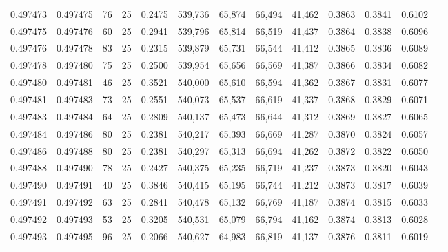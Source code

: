 \begin{tabular}{rrrrrrrrrrrrr}
0.497473 & 0.497475 &    76 &  25 &                                     0.2475 & 539,736 &  65,874 &  66,494 &  41,462 & 0.3863 & 0.3841 & 0.6102 \\
0.497475 & 0.497476 &    60 &  25 &                                     0.2941 & 539,796 &  65,814 &  66,519 &  41,437 & 0.3864 & 0.3838 & 0.6096 \\
0.497476 & 0.497478 &    83 &  25 &                                     0.2315 & 539,879 &  65,731 &  66,544 &  41,412 & 0.3865 & 0.3836 & 0.6089 \\
0.497478 & 0.497480 &    75 &  25 &                                     0.2500 & 539,954 &  65,656 &  66,569 &  41,387 & 0.3866 & 0.3834 & 0.6082 \\
0.497480 & 0.497481 &    46 &  25 &                                     0.3521 & 540,000 &  65,610 &  66,594 &  41,362 & 0.3867 & 0.3831 & 0.6077 \\
0.497481 & 0.497483 &    73 &  25 &                                     0.2551 & 540,073 &  65,537 &  66,619 &  41,337 & 0.3868 & 0.3829 & 0.6071 \\
0.497483 & 0.497484 &    64 &  25 &                                     0.2809 & 540,137 &  65,473 &  66,644 &  41,312 & 0.3869 & 0.3827 & 0.6065 \\
0.497484 & 0.497486 &    80 &  25 &                                     0.2381 & 540,217 &  65,393 &  66,669 &  41,287 & 0.3870 & 0.3824 & 0.6057 \\
0.497486 & 0.497488 &    80 &  25 &                                     0.2381 & 540,297 &  65,313 &  66,694 &  41,262 & 0.3872 & 0.3822 & 0.6050 \\
0.497488 & 0.497490 &    78 &  25 &                                     0.2427 & 540,375 &  65,235 &  66,719 &  41,237 & 0.3873 & 0.3820 & 0.6043 \\
0.497490 & 0.497491 &    40 &  25 &                                     0.3846 & 540,415 &  65,195 &  66,744 &  41,212 & 0.3873 & 0.3817 & 0.6039 \\
0.497491 & 0.497492 &    63 &  25 &                                     0.2841 & 540,478 &  65,132 &  66,769 &  41,187 & 0.3874 & 0.3815 & 0.6033 \\
0.497492 & 0.497493 &    53 &  25 &                                     0.3205 & 540,531 &  65,079 &  66,794 &  41,162 & 0.3874 & 0.3813 & 0.6028 \\
0.497493 & 0.497495 &    96 &  25 &                                     0.2066 & 540,627 &  64,983 &  66,819 &  41,137 & 0.3876 & 0.3811 & 0.6019 \\

\end{tabular}
